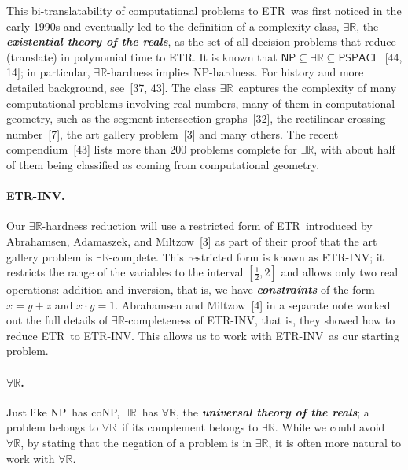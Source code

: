 \documentclass{article}
\newcommand{\defn}[1]{\textit{\textbf{\boldmath #1}}}
\begin{document}
This bi-translatability of computational problems to \textnormal{\textsc{ETR}}\ was first noticed in the early 1990s and eventually led to the definition of a complexity class, \ensuremath{\exists\mathbb{R}}, the \defn{existential theory of the reals}, as the set of all decision problems that reduce (translate) in polynomial time to \textnormal{\textsc{ETR}}. It is known that $\textsf{NP} \subseteq \ensuremath{\exists\mathbb{R}} \subseteq \textsf{PSPACE}$~[44, 14]; in particular, \ensuremath{\exists\mathbb{R}}-hardness implies \textsf{NP}-hardness. For history and more detailed background, see~[37, 43]. 
The class \ensuremath{\exists\mathbb{R}}\ captures the complexity of many computational problems involving real numbers, many of them in computational geometry, such as the segment intersection graphs~[32], the rectilinear crossing number~[7], the art gallery problem~[3] and many others. The recent compendium~[43] lists more than 200 problems complete for \ensuremath{\exists\mathbb{R}}, with about half of them being classified as coming from computational geometry.

\paragraph{\textnormal{\textsc{ETR-INV}}.} Our \ensuremath{\exists\mathbb{R}}-hardness reduction will use a restricted form of \textnormal{\textsc{ETR}}\ introduced by 
Abrahamsen, Adamaszek, and Miltzow~[3] as part of their proof that the art gallery problem is \ensuremath{\exists\mathbb{R}}-complete. This restricted form is known as \textnormal{\textsc{ETR-INV}}; it restricts the range of the variables to the interval $[\frac{1}{2},2]$ and allows only two real operations: addition and inversion, that is, we have \defn{constraints} of the form $x = y+z$ and $x\cdot y = 1$.
Abrahamsen and Miltzow~[4] in a separate note worked out the full details of \ensuremath{\exists\mathbb{R}}-completeness of \textnormal{\textsc{ETR-INV}}, that is, they showed how to reduce \textnormal{\textsc{ETR}}\ to \textnormal{\textsc{ETR-INV}}. This allows us to work with \textnormal{\textsc{ETR-INV}}\ as our starting problem.

\paragraph{\ensuremath{\forall\mathbb{R}}.} Just like \textsf{NP}\ has \textsf{coNP}, \ensuremath{\exists\mathbb{R}}\ has \ensuremath{\forall\mathbb{R}}, the \defn{universal theory of the reals}; a problem belongs to \ensuremath{\forall\mathbb{R}}\ if its complement belongs to \ensuremath{\exists\mathbb{R}}. While we could avoid \ensuremath{\forall\mathbb{R}}, by stating that the negation of a problem is in \ensuremath{\exists\mathbb{R}}, it is often more natural to work with \ensuremath{\forall\mathbb{R}}. 
\end{document}
